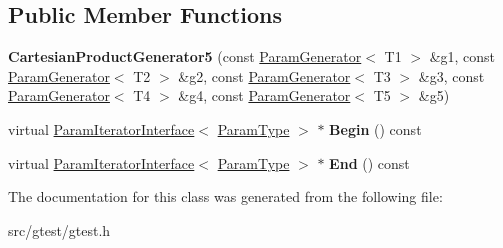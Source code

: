 \subsection*{Public Member Functions}
\begin{DoxyCompactItemize}
\item 
\mbox{\label{classtesting_1_1internal_1_1_cartesian_product_generator5_ab25fd0df9d6325f10f218c3b7553820d}} 
{\bfseries Cartesian\+Product\+Generator5} (const \mbox{\hyperlink{classtesting_1_1internal_1_1_param_generator}{Param\+Generator}}$<$ T1 $>$ \&g1, const \mbox{\hyperlink{classtesting_1_1internal_1_1_param_generator}{Param\+Generator}}$<$ T2 $>$ \&g2, const \mbox{\hyperlink{classtesting_1_1internal_1_1_param_generator}{Param\+Generator}}$<$ T3 $>$ \&g3, const \mbox{\hyperlink{classtesting_1_1internal_1_1_param_generator}{Param\+Generator}}$<$ T4 $>$ \&g4, const \mbox{\hyperlink{classtesting_1_1internal_1_1_param_generator}{Param\+Generator}}$<$ T5 $>$ \&g5)
\item 
\mbox{\label{classtesting_1_1internal_1_1_cartesian_product_generator5_ae5b21ceed037d725dd48ea54cb8d012a}} 
virtual \mbox{\hyperlink{classtesting_1_1internal_1_1_param_iterator_interface}{Param\+Iterator\+Interface}}$<$ \mbox{\hyperlink{classstd_1_1tr1_1_1tuple}{Param\+Type}} $>$ $\ast$ {\bfseries Begin} () const
\item 
\mbox{\label{classtesting_1_1internal_1_1_cartesian_product_generator5_a0775fef90fab1c6a11378b9bcca89849}} 
virtual \mbox{\hyperlink{classtesting_1_1internal_1_1_param_iterator_interface}{Param\+Iterator\+Interface}}$<$ \mbox{\hyperlink{classstd_1_1tr1_1_1tuple}{Param\+Type}} $>$ $\ast$ {\bfseries End} () const
\end{DoxyCompactItemize}


The documentation for this class was generated from the following file\+:\begin{DoxyCompactItemize}
\item 
src/gtest/gtest.\+h\end{DoxyCompactItemize}

